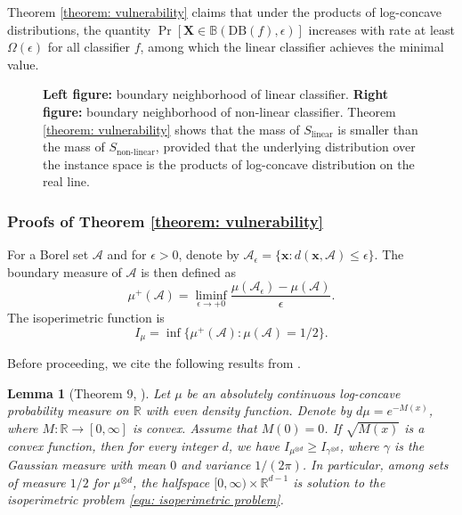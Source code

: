 \documentclass[11pt]{article}
\newcommand{\boundary}{\mathrm{DB}}
\newtheorem{lemma}[theorem]{Lemma}
\newcommand{\x}{\bm{x}}
\newcommand{\R}{\mathbb{R}}
\newcommand{\X}{\bm{X}}
\newcommand{\0}{\mathbf{0}}
\newcommand{\1}{\mathbf{1}}
\newcommand{\cA}{\mathcal{A}}
\newcommand{\bbB}{\mathbb{B}}
\begin{document}
Theorem \ref{theorem: vulnerability} claims that under the products of log-concave distributions, the quantity $\Pr[\X\in\bbB(\boundary(f),\epsilon)]$ increases with rate at least $\Omega(\epsilon)$ for all classifier $f$, among which the linear classifier achieves the minimal value.


\begin{figure}[t]
\centering
{}
\caption{\textbf{Left figure:} boundary neighborhood of linear classifier. \textbf{Right figure:} boundary neighborhood of non-linear classifier. Theorem \ref{theorem: vulnerability} shows that the mass of $S_{\text{linear}}$ is smaller than the mass of $S_{\text{non-linear}}$, provided that the underlying distribution over the instance space is the products of log-concave distribution on the real line.}
\label{figure: isoperimetry}
\end{figure}

\subsubsection{Proofs of Theorem \ref{theorem: vulnerability}}

For a Borel set $\cA$ and for $\epsilon>0$, denote by $\cA_\epsilon=\{\x:d(\x,\cA)\le\epsilon\}$. The boundary measure of $\cA$ is then defined as
\begin{equation*}
\mu^+(\cA)=\liminf_{\epsilon\rightarrow+0}\frac{\mu(\cA_\epsilon)-\mu(\cA)}{\epsilon}.
\end{equation*}
The isoperimetric function is
\begin{equation}
\label{equ: isoperimetric problem}
I_\mu=\inf\{\mu^+(\cA):\mu(\cA)=1/2\}.
\end{equation}

Before proceeding, we cite the following results from \cite{barthe2001extremal}.
\begin{lemma}[Theorem 9, \cite{barthe2001extremal}]
\label{lemma: isoperimetry}
Let $\mu$ be an absolutely continuous log-concave probability measure on $\R$ with even density function. Denote by $d\mu=e^{-M(x)}$, where $M:\R\rightarrow[0,\infty]$ is convex. Assume that $M(0)=0$. If $\sqrt{M(x)}$ is a convex function, then for every integer $d$, we have $I_{\mu^{\otimes d}}\ge I_{\gamma^{\otimes d}}$, where $\gamma$ is the Gaussian measure with mean $0$ and variance $1/(2\pi)$. In particular, among sets of measure $1/2$ for $\mu^{\otimes d}$, the halfspace $[0,\infty)\times \R^{d-1}$ is solution to the isoperimetric problem \eqref{equ: isoperimetric problem}.
\end{lemma}
\end{document}
